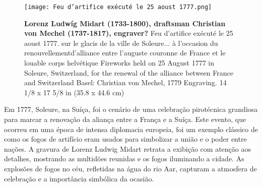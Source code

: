 \begin{wrapfigure}{r}{0.4\textwidth} %
    \centering
    \texttt{[image: Feu d'artifice exécuté le 25 aoust 1777.png]}
    \caption{\fontsize{8}{8}\selectfont \textbf{Lorenz Ludwíg Midart (1733-1800), draftsman Christian von Mechel (1737-1817), engraver?} Feu d'artifice exécuté le 25 aoust 1777. sur le glacis de la ville de Soleure... à l'occasion du renouvellementd'alliance entre l'auguste couronne de France et le louable corps helvétique Fireworks held on 25 August 1777 in Soleure, Switzerland, for the renewal of the alliance between France and Switzerland Basel: Christian von Mechel, 1779 Engraving. 14 1/8 x 17 5/8 in (35.8 x 44.6 cm) }
\end{wrapfigure}

Em 1777, Soleure, na Suíça, foi o cenário de uma celebração pirotécnica grandiosa para marcar a renovação da aliança entre a França e a Suíça. Este evento, que ocorreu em uma época de intensa diplomacia europeia, foi um exemplo clássico de como os fogos de artifício eram usados para simbolizar a união e o poder entre nações. A gravura de Lorenz Ludwig Midart retrata a exibição com atenção aos detalhes, mostrando as multidões reunidas e os fogos iluminando a cidade. As explosões de fogos no céu, refletidas na água do rio Aar, capturam a atmosfera de celebração e a importância simbólica da ocasião.